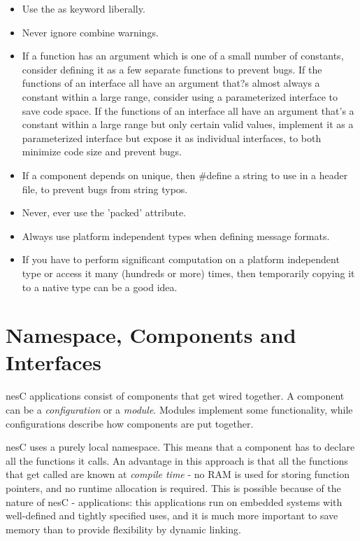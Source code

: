 \begin{itemize}
 \item Use the as keyword liberally.
 \item Never ignore combine warnings.
 \item If a function has an argument which is one of a small number of constants, consider
defining it as a few separate functions to prevent bugs. If the functions of an interface all have an argument
that?s almost always a constant within a large range, consider using a parameterized interface to save code
space. If the functions of an interface all have an argument that's a constant within a large range but only
certain valid values, implement it as a parameterized interface but expose it as individual interfaces, to both
minimize code size and prevent bugs.
 \item If a component depends on unique, then \#define a string to use in a header file, to
prevent bugs from string typos.
 \item Never, ever use the 'packed' attribute.
 \item Always use platform independent types when defining message formats.
 \item If you have to perform significant computation on a platform independent type or
access it many (hundreds or more) times, then temporarily copying it to a native type can be a good idea.


\end{itemize}

\section{Namespace, Components and Interfaces}

nesC applications consist of components that get wired together. A component can be a \textit{configuration} or a \textit{module}. Modules implement some functionality, while configurations describe how components are put together.

nesC uses a purely local namespace. This means that a component has to declare all the functions it calls. An advantage in this approach is that all the functions that get called are known at \textit{compile time} - no RAM is used for storing function pointers, and no runtime allocation is required. This is possible because of the nature of nesC - applications: this applications run on embedded systems with well-defined and tightly specified uses, and it is much more important to save memory than to provide flexibility by dynamic linking.

